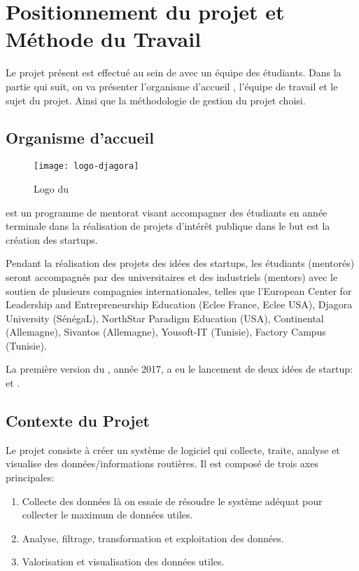 \chapter{Positionnement du projet et Méthode du Travail}

Le projet présent est effectué au sein de  avec un
équipe des étudiants. Dans la partie qui suit, on va présenter l'organisme
d'accueil , l'équipe de travail et le sujet du
projet. Ainsi que la méthodologie de gestion du projet choisi.

\section{Organisme d'accueil }

\begin{figure}[!h]
    \centering
    \texttt{[image: logo-djagora]}
    \caption{Logo du }
\label{fig:logo-djagora}
\end{figure}

 est un programme de mentorat visant accompagner des
étudiants en année terminale dans la réalisation de projets d'intérêt publique
dans le but est la création des startups.

Pendant la réalisation des projets des idées des startups, les étudiants
(mentorés) seront accompagnés par des universitaires et des industriels
(mentors) avec le soutien de plusieurs compagnies internationales, telles que
l'European Center for Leadership and Entrepreneurship Education (Eclee France,
Eclee USA), Djagora University (SénégaL), NorthStar Paradigm Education (USA),
Continental (Allemagne), Sivantos (Allemagne), Yousoft-IT (Tunisie), Factory
Campus (Tunisie).~\cite{djagora-intro}

La première version du , année 2017, a eu le
lancement de deux idées de startup:  et .

\section{Contexte du Projet}

Le projet  consiste à créer un système de logiciel qui
collecte, traite, analyse et visualise des données/informations routières. Il
est composé de trois axes principales:

\begin{enumerate}
    \item Collecte des données là on essaie de résoudre le système adéquat pour
        collecter le maximum de données utiles.
    \item Analyse, filtrage, transformation et exploitation des données.
    \item Valorisation et visualisation des données utiles.
\end{enumerate}

